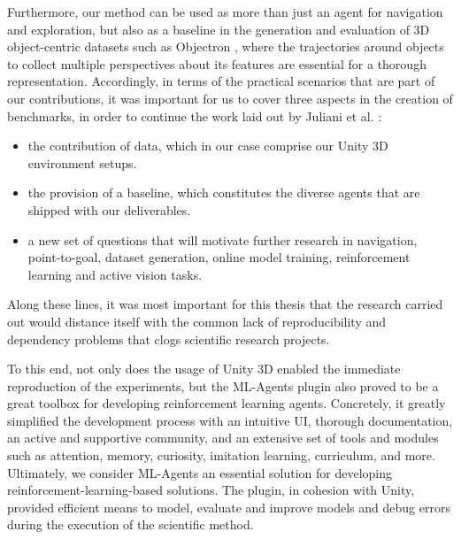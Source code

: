     Furthermore, our method can be used as more than just an agent for navigation and exploration, but also as a baseline in the generation and evaluation of 3D object-centric datasets such as Objectron \cite{objectron2021dataset}, where the trajectories around objects to collect multiple perspectives about its features are essential for a thorough representation. Accordingly, in terms of the practical scenarios that are part of our contributions, it was important for us to cover three aspects in the creation of benchmarks, in order to continue the work laid out by Juliani et al. \cite{juliani2018unity}: 
    \begin{itemize}
        \item the contribution of data, which in our case comprise our Unity 3D environment setups.
        \item the provision of a baseline, which constitutes the diverse agents that are shipped with our deliverables.
        \item a new set of questions that will motivate further research in navigation, point-to-goal, dataset generation, online model training, reinforcement learning and active vision tasks.
    \end{itemize}

    Along these lines, it was most important for this thesis that the research carried out would distance itself with the common lack of reproducibility and dependency problems that clogs scientific research projects.

    To this end, not only does the usage of Unity 3D enabled the immediate reproduction of the experiments, but the ML-Agents plugin also proved to be a great toolbox for developing reinforcement learning agents. Concretely, it greatly simplified the development process with an intuitive UI, thorough documentation, an active and supportive community, and an extensive set of tools and modules such as attention, memory, curiosity, imitation learning, curriculum, and more.
    Ultimately, we consider ML-Agents an essential solution for developing reinforcement-learning-based solutions. The plugin, in cohesion with Unity, provided efficient means to model, evaluate and improve models and debug errors during the execution of the scientific method. 
     
